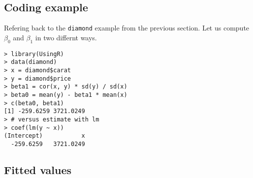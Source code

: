 %

\subsection{Coding example}

Refering back to the \texttt{diamond} example from the previous section. Let us compute $\beta_0$ and $\beta_1$ in two differnt ways.

\begin{verbatim}
> library(UsingR)
> data(diamond)
> x = diamond$carat
> y = diamond$price
> beta1 = cor(x, y) * sd(y) / sd(x)
> beta0 = mean(y) - beta1 * mean(x)
> c(beta0, beta1)
[1] -259.6259 3721.0249
> # versus estimate with lm
> coef(lm(y ~ x))
(Intercept)           x 
  -259.6259   3721.0249 
\end{verbatim}

\subsection{Fitted values}

